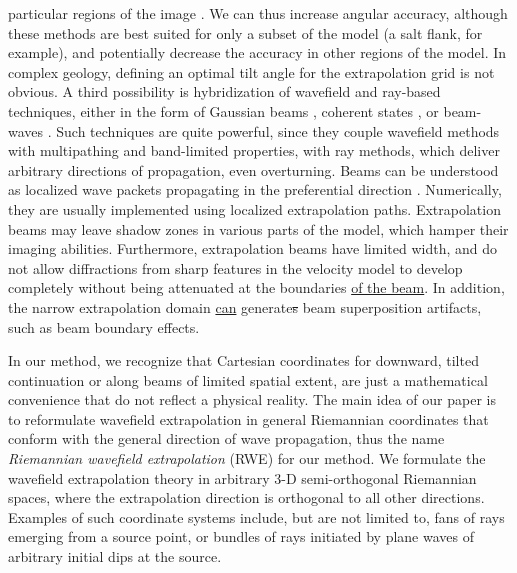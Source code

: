 particular regions of the image 
\cite[]{GEO59-05-08010809,Wu-SEG02}.
We can thus increase angular accuracy, although these methods 
are best suited for only a subset of the model 
(a salt flank, for example),
and potentially decrease the accuracy in other regions of the model. 
In complex geology, 
defining an optimal
tilt angle for the extrapolation grid is not obvious. 
\itt A third possibility is hybridization of 
wavefield and ray-based techniques, either in the form 
of Gaussian beams 
\cite[]{cerveny,GEO.55.11.14161428,GEO66-04-12401250,Gray-SEG02},
coherent states 
\cite[]{Albertin-SEG01,Albertin-SEG02},
or beam-waves 
\cite[]{BDEtgen-EAGE03}.
Such techniques are quite powerful, since they
couple wavefield methods with
multipathing and band-limited properties, with
ray methods, which deliver arbitrary directions 
of propagation, even overturning.
Beams can be understood as localized wave packets propagating in the 
preferential direction
\cite[]{SEG-2000-10081011}.
Numerically, they are usually implemented using localized 
extrapolation paths.
Extrapolation
beams may leave shadow zones in various parts 
of the model, which hamper their imaging abilities.
Furthermore, extrapolation beams have limited width, 
and do not allow diffractions from sharp features in the
velocity model to develop completely without being
attenuated at the boundaries \uline{of the beam}.
In addition, the narrow 
extrapolation domain \uline{can} generate\sout{s} beam superposition
artifacts, such as beam boundary effects.
\eit
\par
In our method, we recognize that Cartesian coordinates for 
downward, tilted continuation or along beams of limited spatial extent,
are just a mathematical convenience that do not reflect a 
physical reality.
The main idea of our paper is to reformulate wavefield 
extrapolation in general Riemannian coordinates that conform
with the general direction of wave propagation,
thus the name {\it Riemannian wavefield extrapolation} (RWE)
for our method.
We formulate the wavefield extrapolation theory in arbitrary {3-D} 
semi-orthogonal Riemannian spaces, where the extrapolation direction
is orthogonal to all other directions.
Examples of such coordinate systems include, but are not limited
to, fans of rays emerging from a source point, 
or bundles of rays initiated by plane waves of arbitrary
initial dips at the source.
